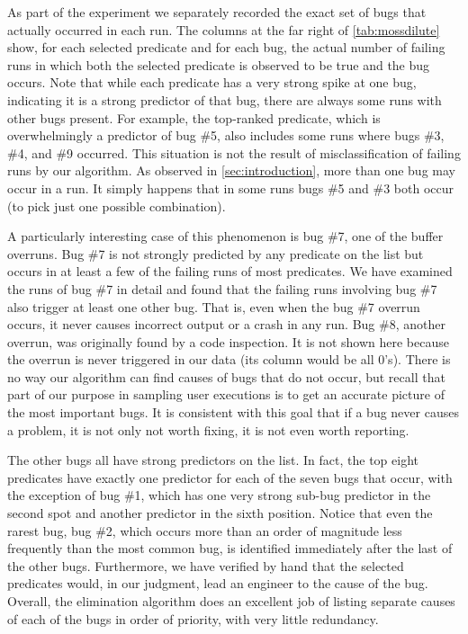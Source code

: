 As part of the experiment we separately recorded the exact set of
bugs that actually occurred in each run.
The columns at the far right of \autoref{tab:mossdilute} show, for
each selected predicate and for each bug, the actual number of failing
runs in which both the selected predicate is observed to be true and
the bug occurs.
Note that while each
predicate has a very strong spike at one bug, indicating it is a
strong predictor of that bug, there are always some runs with other
bugs present.  For example, the top-ranked predicate, which is
overwhelmingly a predictor of bug \#5, also includes some runs where
bugs \#3, \#4, and \#9 occurred.  This situation is not the result of
misclassification of failing runs by our algorithm.  As observed in
\autoref{sec:introduction}, more than one bug may occur in a run.
It simply happens that in some runs bugs \#5 and \#3 both occur (to
pick just one possible combination).

A particularly interesting case of this phenomenon is bug \#7, one of
the buffer overruns.  Bug \#7 is not strongly predicted by any
predicate on the list but occurs in at least a few of the
failing runs of most predicates.  We have examined the runs of bug \#7
in detail and found that the failing runs involving bug \#7 also
trigger at least one other bug.  That is, even when the bug \#7 overrun
occurs, it never causes incorrect output or a crash
in any run.  Bug \#8, another overrun, was originally found by a code
inspection.  It is not shown here because the overrun is never
triggered in our data (its column would be all 0's).
There is no way our algorithm can find causes of bugs that do not
occur, but recall that part of our purpose in sampling user executions
is to get an accurate picture of the most important bugs.  It is
consistent with this goal that if a bug never causes a problem, it is
not only not worth fixing, it is not even worth reporting.

The other bugs all have strong predictors on the list.  In fact,
the top eight predicates have exactly one predictor for each of the seven
bugs that occur, with the exception of bug \#1, which has one very
strong sub-bug predictor in the second spot and another predictor
in the sixth position.  Notice that even the rarest bug, bug \#2,
which occurs more than an order of magnitude less frequently than
the most common bug, is identified immediately after the last of
the other bugs.  Furthermore, we have verified by hand that
the selected predicates would, in our judgment, lead an engineer to
the cause of the bug. Overall, the elimination algorithm does an excellent
job of listing separate causes of each of the bugs in order of priority,
with very little redundancy.


